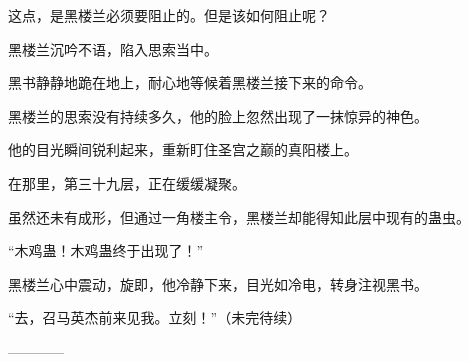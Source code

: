 \begin{this_body}
这点，是黑楼兰必须要阻止的。但是该如何阻止呢？

黑楼兰沉吟不语，陷入思索当中。

黑书静静地跪在地上，耐心地等候着黑楼兰接下来的命令。

黑楼兰的思索没有持续多久，他的脸上忽然出现了一抹惊异的神色。

他的目光瞬间锐利起来，重新盯住圣宫之巅的真阳楼上。

在那里，第三十九层，正在缓缓凝聚。

虽然还未有成形，但通过一角楼主令，黑楼兰却能得知此层中现有的蛊虫。

“木鸡蛊！木鸡蛊终于出现了！”

黑楼兰心中震动，旋即，他冷静下来，目光如冷电，转身注视黑书。

“去，召马英杰前来见我。立刻！”（未完待续）

------------

\end{this_body}

